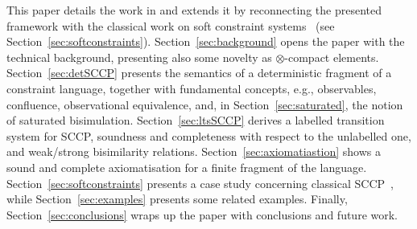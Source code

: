 \documentclass[main.tex]{subfiles}
\begin{document}
This paper details the work in \cite{coordination15} and extends it  by  reconnecting the presented framework with the classical work on  soft 
constraint systems~\cite{scc} (see Section~\ref{sec:softconstraints}). Section~\ref{sec:background} opens the paper with the technical background, presenting also some novelty as $\otimes$-compact elements. Section~\ref{sec:detSCCP} presents the semantics of a deterministic fragment of a constraint language, together with fundamental concepts, e.g., observables, confluence, observational equivalence, and, in Section~\ref{sec:saturated}, the notion of saturated bisimulation. Section~\ref{sec:ltsSCCP} derives a labelled transition system for SCCP, soundness and completeness with respect to the unlabelled one, and weak/strong bisimilarity relations. Section~\ref{sec:axiomatiastion} shows a sound and complete axiomatisation for a finite fragment of the language. Section~\ref{sec:softconstraints} presents a case study concerning classical SCCP~\cite{scc}, while Section~\ref{sec:examples} presents some related examples.
Finally, Section~\ref{sec:conclusions} wraps up the paper with conclusions and future work.
	
	 




%
\end{document}
